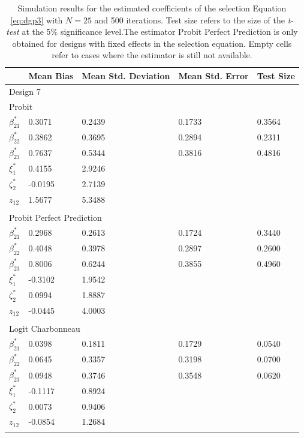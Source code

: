 \begin{table}
  \small
  \centering
  \begin{tabular}{p{3cm}p{1.8cm}p{1.8cm}p{1.8cm}p{1.8cm}}
    \hline
     \quad & Mean Bias & Mean Std. Deviation & Mean Std. Error & Test Size \\
     \hline
\multicolumn{5}{l}{Design 7} \\
   \hline
    \multicolumn{5}{l}{Probit} \\
    $\beta_{21}^*$ & 0.3071 & 0.2439 & 0.1733 & 0.3564\\
    $\beta_{22}^*$ & 0.3862 & 0.3695 & 0.2894 & 0.2311\\
    $\beta_{23}^*$ & 0.7637 & 0.5344& 0.3816 & 0.4816\\
    $\xi_{1}^*$ & 0.4155 & 2.9246 & & \\
    $\zeta_{2}^*$ & -0.0195 & 2.7139 & & \\
     $z_{12}$ & 1.5677 & 5.3488 &  & \\
     & & & & \\
    \hline
    \multicolumn{5}{l}{Probit Perfect Prediction} \\
    $\beta_{21}^*$ & 0.2968 & 0.2613 & 0.1724 & 0.3440\\
    $\beta_{22}^*$ & 0.4048 & 0.3978 & 0.2897 & 0.2600\\
    $\beta_{23}^*$ & 0.8006 & 0.6244 & 0.3855 & 0.4960\\
    $\xi_{1}^*$ & -0.3102 & 1.9542 & & \\
    $\zeta_{2}^*$ & 0.0994 & 1.8887 & & \\
     $z_{12}$ & -0.0445 & 4.0003 &  & \\
     & & & & \\
    \hline
    \multicolumn{5}{l}{Logit Charbonneau} \\
    $\beta_{21}^*$ & 0.0398 & 0.1811 & 0.1729 & 0.0540\\
    $\beta_{22}^*$ & 0.0645 & 0.3357 & 0.3198 & 0.0700\\
    $\beta_{23}^*$ & 0.0948 & 0.3746 & 0.3548 & 0.0620\\
    $\xi_{1}^*$ & -0.1117 & 0.8924 &  & \\
    $\zeta_{2}^*$ & 0.0073 & 0.9406 &  & \\
    $z_{12}$ & -0.0854 & 1.2684 &  & \\
    & & & & \\
   \hline
\end{tabular}
\caption{\footnotesize{Simulation results for the estimated coefficients of the selection Equation \ref{eq:dgp3} with $N=25$ and 500 iterations. Test size refers to the size of the \textit{t-test} at the 5\% significance level.The estimator Probit Perfect Prediction is only obtained for designs with fixed effects in the selection equation. Empty cells refer to cases where the estimator is still not available.}}
\label{tab:3}
\end{table}

